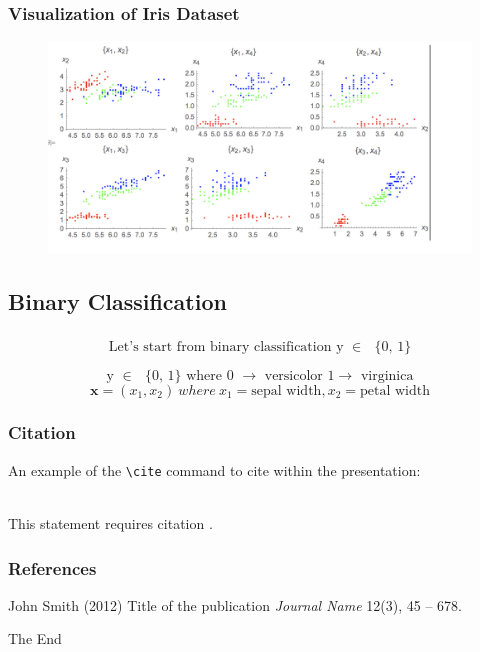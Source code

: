 \documentclass{beamer}
\begin{document}
\begin{frame}
\frametitle{Visualization of Iris Dataset}
\begin{figure}[t]
\includegraphics[scale=0.5]{graphics/feature_vis}
\centering
\end{figure}
\end{frame}
\subsection{Binary Classification}
\begin{frame}
\frametitle{}
\[\text{Let's start from binary classification y $\in $ $\{$0, 1$\}$}\]

\[\text{y $\in $ $\{$0, 1$\}$   where 0 $\to $ versicolor 1$\to $ virginica}\]
\[	
	\mathbf{x} = (x_ 1, x_ 2) \
		where \ x_1 = \text{sepal width}, x_2 = \text{petal width}\]
\end{frame}

\begin{frame}[fragile] %
\frametitle{Citation}
An example of the \verb|\cite| command to cite within the presentation:\\~

This statement requires citation \cite{p1}.
\end{frame}


\begin{frame}
\frametitle{References}
\footnotesize{
\begin{thebibliography}{99} %
\bibitem[Smith, 2012]{p1} John Smith (2012)
\newblock Title of the publication
\newblock \emph{Journal Name} 12(3), 45 -- 678.
\end{thebibliography}
}
\end{frame}


\begin{frame}
\Huge{\centerline{The End}}
\end{frame}

\end{document}
